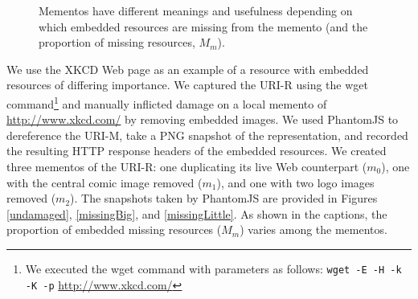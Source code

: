 \begin{figure}[h!t]
\begin{center}
    \qquad
  \end{center}
  \caption{Mementos have different meanings and usefulness depending on which embedded resources are missing from the memento (and the proportion of missing resources, $M_m$).}
  \label{xkcdImgs}
\end{figure}

We use the XKCD Web page as an example of a resource with embedded resources of differing importance. We captured the URI-R using the wget \cite{wget} command\footnote{We executed the wget command with parameters as follows: \texttt{wget -E -H -k -K -p} \url{http://www.xkcd.com/}} and manually inflicted damage on a local memento of \url{http://www.xkcd.com/} by removing embedded images. We used PhantomJS \cite{pjs} to dereference the URI-M, take a PNG snapshot of the representation, and recorded the resulting HTTP response headers of the embedded resources. We created three mementos of the URI-R: one duplicating its live Web counterpart 
($m_0$), one with the central comic image removed ($m_1$), and one with two logo images removed ($m_2$). The snapshots taken by PhantomJS are provided in Figures \ref{undamaged}, \ref{missingBig}, and \ref{missingLittle}. As shown in the captions, the proportion of embedded missing resources ($M_m$) varies among the mementos.

